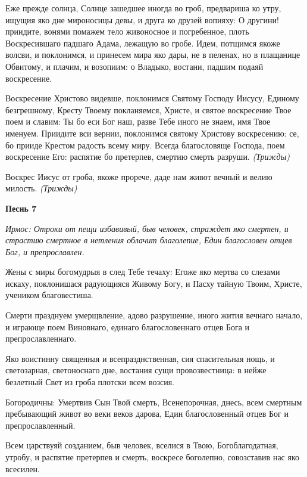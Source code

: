 \normalfont{}Еже прежде солнца, Солнце зашедшее иногда во гроб, предвариша ко утру, ищущия яко дне мироносицы девы, и друга ко друзей вопияху: О другини! приидите, вонями помажем тело живоносное и погребенное, плоть Воскресившаго падшаго Адама, лежащую во гробе. Идем, потщимся якоже волсви, и поклонимся, и принесем мира яко дары, не в пеленах, но в плащанице Обвитому, и плачим, и возопиим: о Владыко, востани, падшим подаяй воскресение. 



Воскресение Христово видевше, поклонимся Святому Господу Иисусу, Единому безгрешному, Кресту Твоему покланяемся, Христе, и святое воскресение Твое поем и славим: Ты бо еси Бог наш, разве Тебе иного не знаем, имя Твое именуем. Приидите вси вернии, поклонимся святому Христову воскресению: се, бо прииде Крестом радость всему миру. Всегда благословяще Господа, поем воскресение Его: распятие бо претерпев, смертию смерть разруши. \itshape (Трижд\normalfont{}ы) 



Воскрес Иисус от гроба, якоже прорече, даде нам живот вечный и велию милость. \itshape (Трижд\normalfont{}ы) 

\medskip\bfseries Песнь 7 

\normalfont{}\itshape Ирмос\normalfont{}: Отроки от пещи избавивый, быв человек, страждет яко смертен, и страстию смертное в нетления облачит благолепие, Един благословен отцев Бог, и препрославлен. 



Жены с миры богомудрыя в след Тебе течаху: Егоже яко мертва со слезами искаху, поклонишася радующияся Живому Богу, и Пасху тайную Твоим, Христе, учеником благовестиша. 



Смерти празднуем умерщвление, адово разрушение, иного жития вечнаго начало, и играюще поем Виновнаго, единаго благословеннаго отцев Бога и препрославленнаго. 



Яко воистинну священная и всепразднственная, сия спасительная нощь, и светозарная, светоноснаго дне, востания сущи провозвестница: в нейже безлетный Свет из гроба плотски всем возсия. \itshape 

Богородичны\normalfont{}: Умертвив Сын Твой смерть, Всенепорочная, днесь, всем смертным пребывающий живот во веки веков дарова, Един благословенный отцев Бог и препрославленный. 



Всем царствуяй созданием, быв человек, вселися в Твою, Богоблагодатная, утробу, и распятие претерпев и смерть, воскресе боголепно, совозставив нас яко всесилен. 

